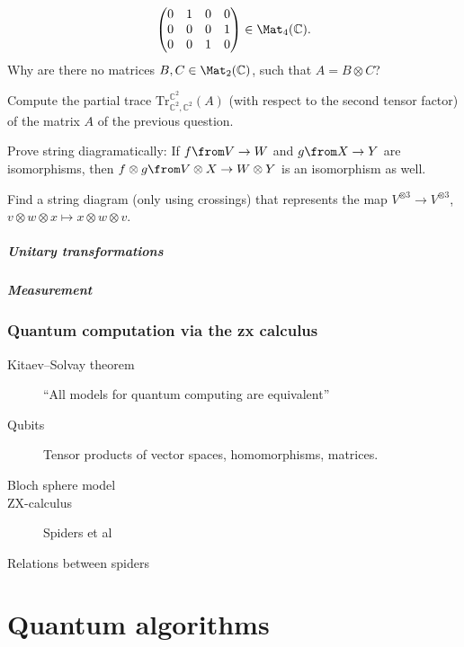 \documentclass[a4paper,oneside, 12pt]{amsart}
\begin{document}
\begin{thmlist}
\begin{equation*}
\begin{pmatrix}
    0 & 1 & 0 & 0 \\
    0 & 0 & 0 & 1 \\
    0 & 0 & 1 & 0
  \end{pmatrix} \in \Mat_{4}(\mathbb{C}).
\end{equation*}
  Why are there no matrices \(B, C \in \Mat_{2}( \mathbb{C})\), such that \(A= B\otimes C\)?
  \item Compute the partial trace \(\mathrm{Tr}_{ \mathbb{C}^{2}, \mathbb{C}^{2}}^{ \mathbb{C}^{2}}(A)\) (with respect to the second tensor factor) of the matrix \(A\) of the previous question.
  \item Prove string diagramatically: If \(f \from V \to W\) and \(g \from X \to Y\) are isomorphisms, then \(f\otimes g \from V\otimes X \to W\otimes Y\) is an isomorphism as well.
  \item Find a string diagram (only using crossings) that represents the map \(V^{\otimes 3}\to V^{\otimes 3}\),
  \(v\otimes w \otimes x \mapsto x \otimes w \otimes v\).
\end{thmlist}

\subsubsection*{Unitary transformations}

\subsubsection*{Measurement}


\cleardoublepage
\section{Quantum computation via the zx calculus}\label{sec:quantum-computation-via-the-zx-calculus}
\begin{description}
  \item[Kitaev--Solvay theorem] ``All models for quantum computing are equivalent''
  \item[Qubits] Tensor products of vector spaces, homomorphisms, matrices.
  \item[Bloch sphere model]
  \item[ZX-calculus] Spiders et al
  \item[Relations between spiders]
\end{description}

\part{Quantum algorithms}
\end{document}
